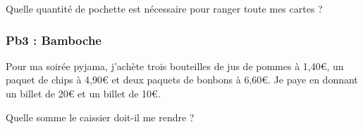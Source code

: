 Quelle quantité de pochette est nécessaire pour ranger toute mes cartes ?

\Pointilles[6]


\subsubsection*{Pb3 : Bamboche} 

Pour ma soirée pyjama, j'achète trois bouteilles de jus de pommes à 1,40€, un paquet de chips à 4,90€ et deux paquets de bonbons à 6,60€. Je paye en donnant un billet de 20€ et un billet de 10€. 

Quelle somme le caissier doit-il me rendre ?

\Pointilles[6]



